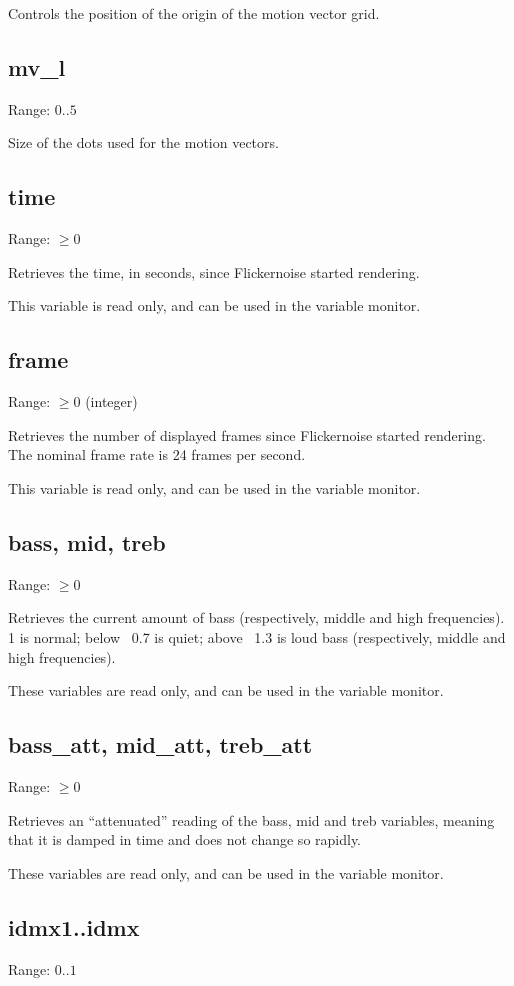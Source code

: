 \documentclass[11pt, a5paper, pagesize]{scrbook}
\begin{document}
Controls the position of the origin of the motion vector grid.

\subsection{mv\_l}
Range: $0..5$

Size of the dots used for the motion vectors.

\subsection{time}
Range: $\geq 0$

Retrieves the time, in seconds, since Flickernoise started rendering.

This variable is read only, and can be used in the variable monitor.

\subsection{frame}
Range: $\geq 0$ (integer)

Retrieves the number of displayed frames since Flickernoise started rendering. The nominal frame rate is 24 frames per second.

This variable is read only, and can be used in the variable monitor.

\subsection{bass, mid, treb}
Range: $\geq 0$

Retrieves the current amount of bass (respectively, middle and high frequencies). 1 is normal; below ~0.7 is quiet; above ~1.3 is loud bass (respectively, middle and high frequencies).

These variables are read only, and can be used in the variable monitor.

\subsection{bass\_att, mid\_att, treb\_att}
Range: $\geq 0$

Retrieves an ``attenuated'' reading of the bass, mid and treb variables, meaning that it is damped in time and does not change so rapidly.

These variables are read only, and can be used in the variable monitor.

\subsection{idmx1..idmx\nidmx}
Range: $0..1$
\end{document}
